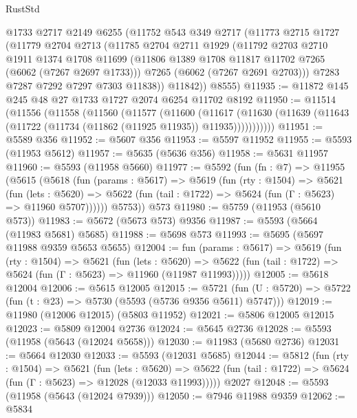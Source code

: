 \begin{lexlean}{RustStd}
\begin{coremodule}
      @1733
      @2717
      @2149
      @6255
      (@11752
        @543
        @349
        @2717
        (@11773
          @2715
          @1727
          (@11779
            @2704
            @2713
            (@11785
              @2704
              @2711
              @1929
              (@11792
                @2703
                @2710
                @1911
                @1374
                @1708
                @11699
                (@11806 @1389 @1708 @11817 @11702 @7265 (@6062 (@7267 @2697 @1733)))
                @7265
                (@6062 (@7267 @2691 @2703)))
              @7283
              @7287
              @7292
              @7297
              @7303
              @11838))
          @11842))
      @8555)
@11935 := @11872 @145 @245 @48 @27 @1733 @1727 @2074 @6254 @11702 @8192
@11950 := @11514
    (@11556
      (@11558
        (@11560
          (@11577
            (@11600
              (@11617
                (@11630 (@11639 (@11643 (@11722 (@11734 (@11862 (@11925 @11935)) @11935)))))))))))
@11951 := @5589 @356
@11952 := @5607 @356
@11953 := @5597 @11952
@11955 := @5593 (@11953 @5612)
@11957 := @5635 (@5636 @356)
@11958 := @5631 @11957
@11960 := @5593 (@11958 @5660)
@11977 := @5592
    (fun (fn : @7) =>
    @11955
      (@5615
        (@5618
          (fun (params : @5617) =>
          @5619
            (fun (rty : @1504) =>
            @5621
              (fun (lets : @5620) =>
              @5622 (fun (tail : @1722) => @5624 (fun (Γ : @5623) => @11960 @5707))))))
        @5753))
    @573
@11980 := @5759 (@11953 (@5610 @573))
@11983 := @5672 (@5673 @573) @9356
@11987 := @5593 (@5664 (@11983 @5681) @5685)
@11988 := @5698 @573
@11993 := @5695 (@5697 @11988 @9359 @5653 @5655)
@12004 := fun (params : @5617) =>
  @5619
    (fun (rty : @1504) =>
    @5621
      (fun (lets : @5620) =>
      @5622 (fun (tail : @1722) => @5624 (fun (Γ : @5623) => @11960 (@11987 @11993)))))
@12005 := @5618 @12004
@12006 := @5615 @12005
@12015 := @5721
    (fun (U : @5720) => @5722 (fun (t : @23) => @5730 (@5593 (@5736 @9356 @5611) @5747)))
@12019 := @11980 (@12006 @12015) (@5803 @11952)
@12021 := @5806 @12005 @12015
@12023 := @5809 @12004 @2736
@12024 := @5645 @2736
@12028 := @5593 (@11958 (@5643 (@12024 @5658)))
@12030 := @11983 (@5680 @2736)
@12031 := @5664 @12030
@12033 := @5593 (@12031 @5685)
@12044 := @5812
    (fun (rty : @1504) =>
    @5621
      (fun (lets : @5620) =>
      @5622 (fun (tail : @1722) => @5624 (fun (Γ : @5623) => @12028 (@12033 @11993)))))
    @2027
@12048 := @5593 (@11958 (@5643 (@12024 @7939)))
@12050 := @7946 @11988 @9359
@12062 := @5834

\end{coremodule}
\end{lexlean}
